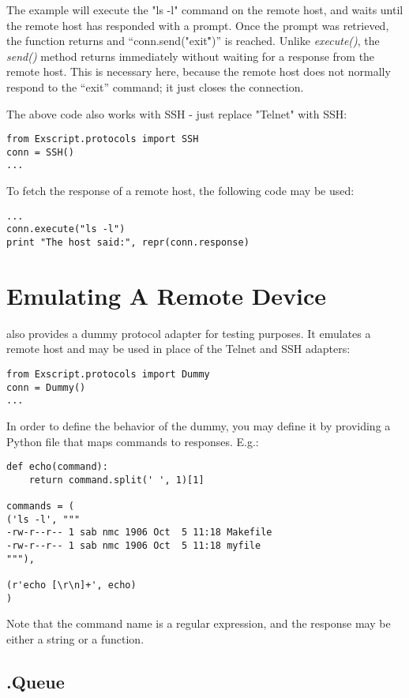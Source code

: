The example will execute the "ls -l" command on the remote host, and 
waits until the remote host has responded with a prompt.
Once the prompt was retrieved, the function returns and 
``conn.send("exit\r")'' is reached.
Unlike {\it execute()}, the {\it send()} method returns immediately without 
waiting for a response from the remote host. This is necessary here, because 
the remote host does not normally respond to the ``exit'' command; it just 
closes the connection.

The above code also works with SSH - just replace "Telnet" with SSH:

\begin{lstlisting}
from Exscript.protocols import SSH
conn = SSH()
...
\end{lstlisting}

To fetch the response of a remote host, the following code may be used:

\begin{lstlisting}
...
conn.execute("ls -l")
print "The host said:", repr(conn.response)
\end{lstlisting}

\section{Emulating A Remote Device}

\product also provides a dummy protocol adapter for testing 
purposes. It emulates a remote host and may be used in place of the Telnet 
and SSH adapters:

\begin{lstlisting}
from Exscript.protocols import Dummy
conn = Dummy()
...
\end{lstlisting}

In order to define the behavior of the dummy, you may define it by 
providing a Python file that maps commands to responses. E.g.:

\begin{lstlisting}
def echo(command):
    return command.split(' ', 1)[1]

commands = (
('ls -l', """
-rw-r--r-- 1 sab nmc 1906 Oct  5 11:18 Makefile
-rw-r--r-- 1 sab nmc 1906 Oct  5 11:18 myfile
"""),

(r'echo [\r\n]+', echo)
)
\end{lstlisting}

Note that the command name is a regular expression, and the response may 
be either a string or a function.


\subsection{\product.Queue}

